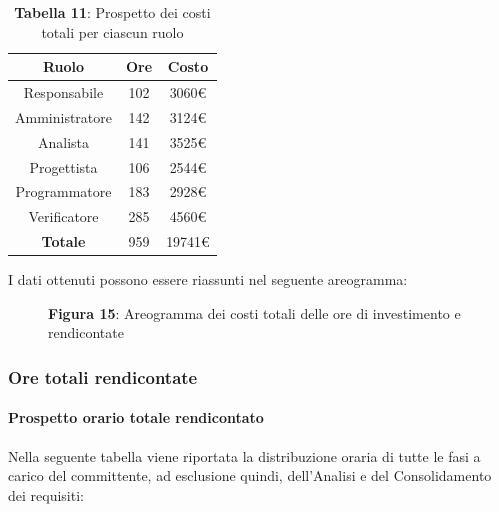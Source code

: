 \begin{table}[H]
	\centering
	\renewcommand{\arraystretch}{1.5}
	\begin{tabular}{|c|c|c|}
		\hline
		\rowcolor{lighter-grayer}
Ruolo & Ore & Costo \\ \hline
Responsabile & 102 & 3060\euro \\ \hline
Amministratore & 142 & 3124\euro \\ \hline
Analista & 141 & 3525\euro \\ \hline
Progettista & 106 & 2544\euro \\ \hline
Programmatore & 183 & 2928\euro \\ \hline
Verificatore & 285 & 4560\euro \\ \hline
\textbf{Totale} & 959 & 19741\euro \\ \hline
	\end{tabular}
	\caption*{\textbf{Tabella 11}: Prospetto dei costi totali per ciascun ruolo \\}
\end{table}

I dati ottenuti possono essere riassunti nel seguente areogramma:


\begin{figure}[H]
	\centering
	\caption*{\textbf{Figura 15}: Areogramma dei costi totali delle ore di investimento e rendicontate}
    \label{fig:Figura10}
\end{figure}

\subsubsection{Ore totali rendicontate}
\paragraph{Prospetto orario totale rendicontato}
Nella seguente tabella viene riportata la distribuzione oraria di tutte le fasi a carico del committente, ad esclusione quindi, dell'Analisi e del Consolidamento dei requisiti:

